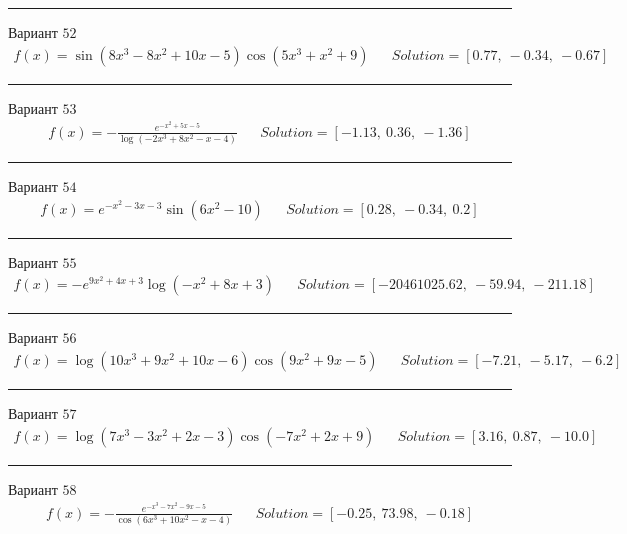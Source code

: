 \documentclass[11pt]{report}
\begin{document}
\begin{center}
    \noindent\rule{8cm}{0.4pt}
\end{center}
Вариант \(52\)
\begin{align*}
    f(x) = \sin{\left(8 x^{3} - 8 x^{2} + 10 x - 5 \right)} \cos{\left(5 x^{3} + x^{2} + 9 \right)} && Solution = \left[ 0.77, \  -0.34, \  -0.67\right]
\end{align*}
\begin{center}
    \noindent\rule{8cm}{0.4pt}
\end{center}
Вариант \(53\)
\begin{align*}
    f(x) = - \frac{e^{- x^{2} + 5 x - 5}}{\log{\left(- 2 x^{3} + 8 x^{2} - x - 4 \right)}} && Solution = \left[ -1.13, \  0.36, \  -1.36\right]
\end{align*}
\begin{center}
    \noindent\rule{8cm}{0.4pt}
\end{center}
Вариант \(54\)
\begin{align*}
    f(x) = e^{- x^{2} - 3 x - 3} \sin{\left(6 x^{2} - 10 \right)} && Solution = \left[ 0.28, \  -0.34, \  0.2\right]
\end{align*}
\begin{center}
    \noindent\rule{8cm}{0.4pt}
\end{center}
Вариант \(55\)
\begin{align*}
    f(x) = - e^{9 x^{2} + 4 x + 3} \log{\left(- x^{2} + 8 x + 3 \right)} && Solution = \left[ -20461025.62, \  -59.94, \  -211.18\right]
\end{align*}
\begin{center}
    \noindent\rule{8cm}{0.4pt}
\end{center}
Вариант \(56\)
\begin{align*}
    f(x) = \log{\left(10 x^{3} + 9 x^{2} + 10 x - 6 \right)} \cos{\left(9 x^{2} + 9 x - 5 \right)} && Solution = \left[ -7.21, \  -5.17, \  -6.2\right]
\end{align*}
\begin{center}
    \noindent\rule{8cm}{0.4pt}
\end{center}
Вариант \(57\)
\begin{align*}
    f(x) = \log{\left(7 x^{3} - 3 x^{2} + 2 x - 3 \right)} \cos{\left(- 7 x^{2} + 2 x + 9 \right)} && Solution = \left[ 3.16, \  0.87, \  -10.0\right]
\end{align*}
\begin{center}
    \noindent\rule{8cm}{0.4pt}
\end{center}
Вариант \(58\)
\begin{align*}
    f(x) = - \frac{e^{- x^{3} - 7 x^{2} - 9 x - 5}}{\cos{\left(6 x^{3} + 10 x^{2} - x - 4 \right)}} && Solution = \left[ -0.25, \  73.98, \  -0.18\right]
\end{align*}
\end{document}
